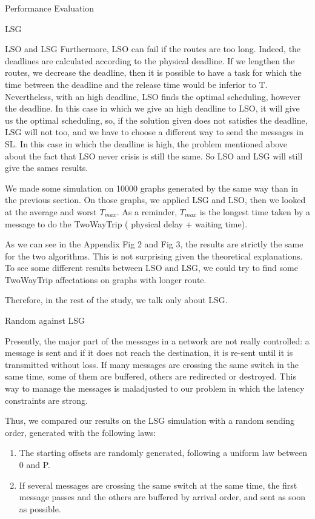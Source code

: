\documentclass[a4paper,10pt]{report}
\begin{document}
\begin{chapter}{Performance Evaluation}
\begin{section}{LSG}
\begin{subsection}{LSO and LSG}
Furthermore, LSO can fail if the routes are too long. Indeed, the deadlines are calculated according to the physical deadline. If we lengthen the routes, we decrease the deadline, then it is possible to have a task for which the time between the deadline and the release time would be inferior to T.
Nevertheless, with an high deadline, LSO finds the optimal scheduling, however the deadline.
In this case in which we give an high deadline to LSO, it will give us the optimal scheduling, so, if the solution given does not satisfies the deadline, LSG will not too, and we have to choose a different way to send the messages in SL.
In this case in which the deadline is high, the problem mentioned above about the fact that LSO never crisis is still the same. So LSO and LSG will still give the sames results.

We made some simulation on 10000 graphs generated by the same way than in the previous section.
On those graphs, we applied LSG and LSO, then we looked at the average and worst $T_{max}$.
As a reminder, $T_{max}$ is the longest time taken by a message to do the TwoWayTrip ( physical delay + waiting time).

As we can see in the Appendix Fig 2 and Fig 3, the results are strictly the same for the two algorithms. This is not surprising given the
theoretical explanations.
To see some different results between LSO and LSG, we could try to find some TwoWayTrip affectations on graphs with longer route.

Therefore, in the rest of the study, we talk only about LSG.
\end{subsection}


\begin{subsection}{Random against LSG}

Presently, the major part of the messages in a network are not really controlled: a message is sent and if it does not reach the destination,
it is re-sent until it is transmitted without loss. If many messages are crossing the same switch in the same time, some of them are buffered,
others are redirected or destroyed. This way to manage the messages is maladjusted to our problem in which the latency constraints are strong.

Thus, we compared our results on the LSG simulation with a random sending order, generated with the following laws: 
\begin{enumerate}
 \item The starting offsets are randomly generated, following a uniform law between 0 and P.
 \item If several messages are crossing the same switch at the same time, the first message passes and the others are buffered by arrival order, and sent as soon as possible.
\end{enumerate}


\end{subsection}
\end{section}
\end{chapter}
\end{document}
